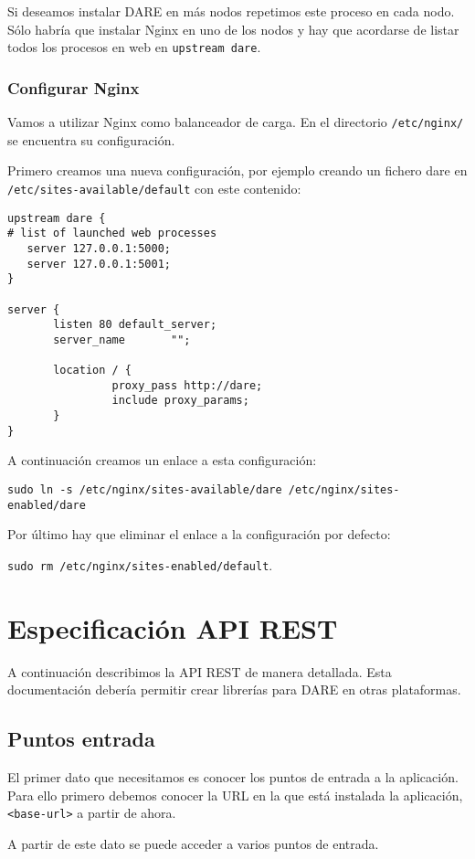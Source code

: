 Si deseamos instalar DARE en más nodos repetimos este proceso en cada
nodo. Sólo habría que instalar Nginx en uno de los nodos y hay que
acordarse de listar todos los procesos en web en \verb+upstream dare+.

\subsubsection{Configurar Nginx}

Vamos a utilizar Nginx como balanceador de carga. En el directorio
\verb+/etc/nginx/+ se encuentra su configuración.

Primero creamos una nueva configuración, por ejemplo creando un
fichero dare en \verb+/etc/sites-available/default+ con este contenido:
\begin{verbatim}
upstream dare {
# list of launched web processes
   server 127.0.0.1:5000;
   server 127.0.0.1:5001;
}

server {
       listen 80 default_server;
       server_name       "";

       location / {
                proxy_pass http://dare;
                include proxy_params;
       }
}
\end{verbatim}

A continuación creamos un enlace a esta configuración:

\verb+sudo ln -s /etc/nginx/sites-available/dare /etc/nginx/sites-enabled/dare+

Por último hay que eliminar el enlace a la configuración por defecto:

\verb+sudo rm /etc/nginx/sites-enabled/default+.

\section{Especificación API REST}

A continuación describimos la API REST de manera detallada. Esta
documentación debería permitir crear librerías para DARE en otras
plataformas.

\subsection{Puntos entrada}
El primer dato que necesitamos es conocer los puntos de entrada a la
aplicación. Para ello primero debemos conocer la URL en la que está
instalada la aplicación, \verb+<base-url>+ a partir de ahora.

A partir de este dato se puede acceder a varios puntos de entrada.

